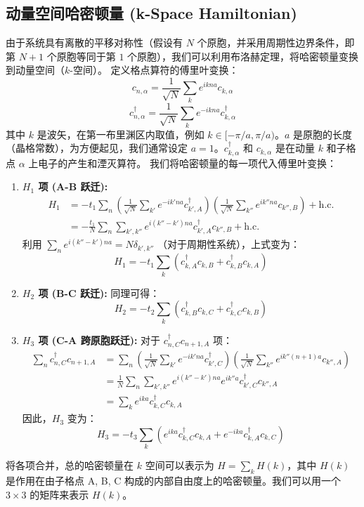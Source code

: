 \documentclass[UTF-8]{ctexart}
\begin{document}
\subsection{动量空间哈密顿量 (k-Space Hamiltonian)}
由于系统具有离散的平移对称性（假设有 $N$ 个原胞，并采用周期性边界条件，即第 $N+1$ 个原胞等同于第 $1$ 个原胞），我们可以利用布洛赫定理，将哈密顿量变换到动量空间（$k$-空间）。
定义格点算符的傅里叶变换：
\[ c_{n,\alpha} = \frac{1}{\sqrt{N}} \sum_k e^{ikna} c_{k,\alpha} \]
\[ c_{n,\alpha}^\dagger = \frac{1}{\sqrt{N}} \sum_k e^{-ikna} c_{k,\alpha}^\dagger \]
其中 $k$ 是波矢，在第一布里渊区内取值，例如 $k \in [-\pi/a, \pi/a)$。$a$ 是原胞的长度（晶格常数），为方便起见，我们通常设定 $a=1$。$c_{k,\alpha}^\dagger$ 和 $c_{k,\alpha}$ 是在动量 $k$ 和子格点 $\alpha$ 上电子的产生和湮灭算符。
我们将哈密顿量的每一项代入傅里叶变换：
\begin{enumerate}
    \item \textbf{$H_1$ 项 (A-B 跃迁):}
    \begin{align*}
    H_1 &= -t_1 \sum_n \left( \frac{1}{\sqrt{N}} \sum_{k'} e^{-ik'na} c_{k',A}^\dagger \right) \left( \frac{1}{\sqrt{N}} \sum_{k''} e^{ik''na} c_{k'',B} \right) + \text{h.c.} \\
    &= -\frac{t_1}{N} \sum_n \sum_{k',k''} e^{i(k''-k')na} c_{k',A}^\dagger c_{k'',B} + \text{h.c.}
    \end{align*}
    利用 $\sum_n e^{i(k''-k')na} = N \delta_{k',k''}$ （对于周期性系统），上式变为：
    \[ H_1 = -t_1 \sum_k (c_{k,A}^\dagger c_{k,B} + c_{k,B}^\dagger c_{k,A}) \]
    \item \textbf{$H_2$ 项 (B-C 跃迁):}
    同理可得：
    \[ H_2 = -t_2 \sum_k (c_{k,B}^\dagger c_{k,C} + c_{k,C}^\dagger c_{k,B}) \]
    \item \textbf{$H_3$ 项 (C-A 跨原胞跃迁):}
    对于 $c_{n,C}^\dagger c_{n+1,A}$ 项：
    \begin{align*}
    \sum_n c_{n,C}^\dagger c_{n+1,A} &= \sum_n \left( \frac{1}{\sqrt{N}} \sum_{k'} e^{-ik'na} c_{k',C}^\dagger \right) \left( \frac{1}{\sqrt{N}} \sum_{k''} e^{ik''(n+1)a} c_{k'',A} \right) \\
    &= \frac{1}{N} \sum_n \sum_{k',k''} e^{i(k''-k')na} e^{ik''a} c_{k',C}^\dagger c_{k'',A} \\
    &= \sum_k e^{ika} c_{k,C}^\dagger c_{k,A}
    \end{align*}
    因此，$H_3$ 变为：
    \[ H_3 = -t_3 \sum_k (e^{ika} c_{k,C}^\dagger c_{k,A} + e^{-ika} c_{k,A}^\dagger c_{k,C}) \]
\end{enumerate}
将各项合并，总的哈密顿量在 $k$ 空间可以表示为 $H = \sum_k H(k)$，其中 $H(k)$ 是作用在由子格点 A, B, C 构成的内部自由度上的哈密顿量。我们可以用一个 $3 \times 3$ 的矩阵来表示 $H(k)$。
\end{document}
